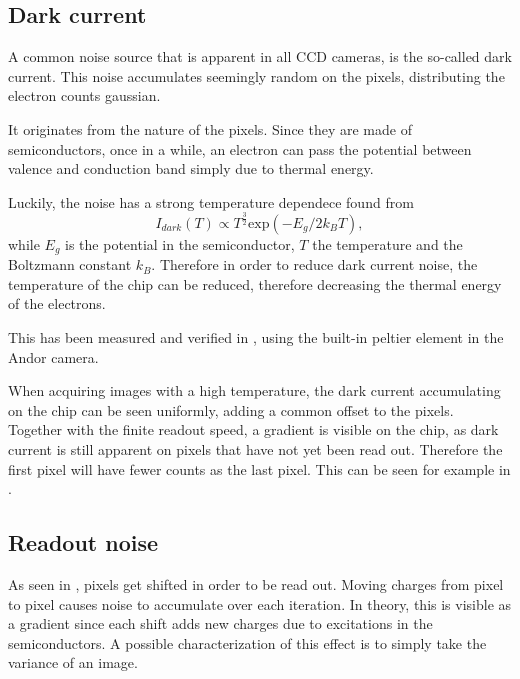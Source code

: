 \subsection{Dark current}
A common noise source that is apparent in all CCD cameras, is the so-called dark current. This noise accumulates seemingly random on the pixels, distributing the electron counts gaussian.

It originates from the nature of the pixels. Since they are made of semiconductors, once in a while, an electron can pass the potential between valence and conduction band simply due to thermal energy.

Luckily, the noise has a strong temperature dependece found from
\begin{equation}
I_{dark}(T) \propto T^{\frac{3}{2}} \mathrm{exp}(-E_g/2k_BT),
\end{equation}
while $E_g$ is the potential in the semiconductor, $T$ the temperature and the Boltzmann constant $k_B$.
Therefore in order to reduce dark current noise, the temperature of the chip can be reduced, therefore decreasing the thermal energy of the electrons.

This has been measured and verified in , using the built-in peltier element in the Andor camera.

When acquiring images with a high temperature, the dark current accumulating on the chip can be seen uniformly, adding a common offset to the pixels. Together with the finite readout speed, a gradient is visible on the chip, as dark current is still apparent on pixels that have not yet been read out. Therefore the first pixel will have fewer counts as the last pixel.
This can be seen for example in .


\newpage
\subsection{Readout noise}
As seen in , pixels get shifted in order to be read out. Moving charges from pixel to pixel causes noise to accumulate over each iteration. In theory, this is visible as a gradient since each shift adds new charges due to excitations in the semiconductors. A possible characterization of this effect is to simply take the variance of an image.

